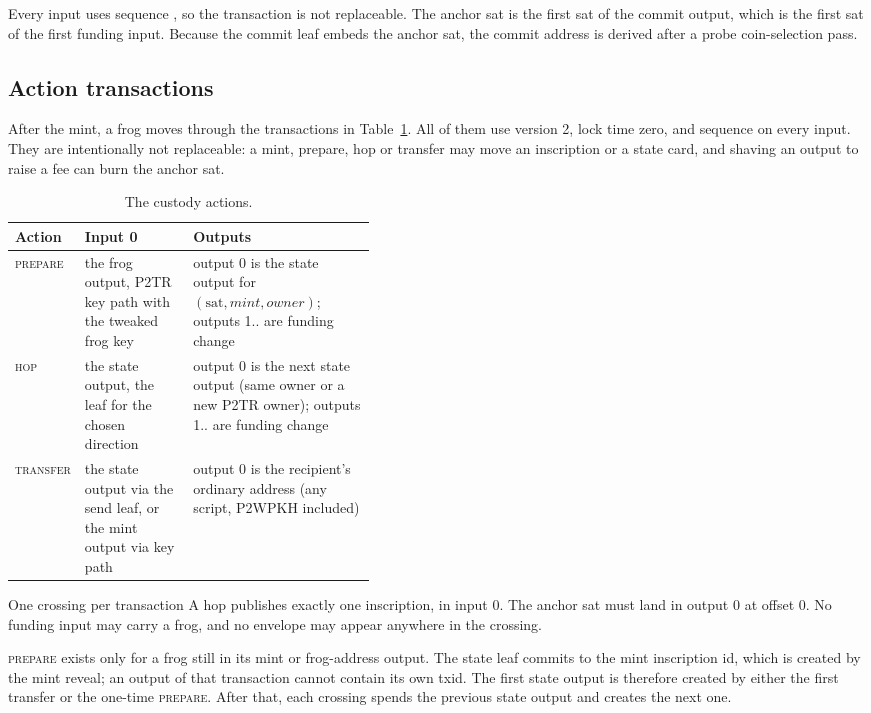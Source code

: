 Every input uses sequence , so the transaction is not
replaceable. The anchor sat is the first sat of the commit output, which is
the first sat of the first funding input. Because the commit leaf embeds the
anchor sat, the commit address is derived after a probe coin-selection pass.

\subsection{Action transactions}

After the mint, a frog moves through the transactions in
Table~\ref{tab:actions}. All of them use version 2, lock time zero, and
sequence  on every input. They are intentionally not
replaceable: a mint, prepare, hop or transfer may move an inscription or a
state card, and shaving an output to raise a fee can burn the anchor sat.

\begin{table}[htbp]
\centering
\small
\caption{The custody actions.}
\label{tab:actions}
\begin{tabularx}{\linewidth}{@{}p{0.12\linewidth}p{0.30\linewidth}X@{}}
\toprule
\textbf{Action} & \textbf{Input 0} & \textbf{Outputs} \\
\midrule
\textsc{prepare} & the frog output, P2TR key path with the tweaked frog key &
output 0 is the state output for $(\mathrm{sat},\mathit{mint},\mathit{owner})$;
outputs 1.. are funding change \\
\textsc{hop} & the state output, the leaf for the chosen direction &
output 0 is the next state output (same owner or a new P2TR owner);
outputs 1.. are funding change \\
\textsc{transfer} & the state output via the send leaf, or the mint output via
key path & output 0 is the recipient's ordinary address (any script, P2WPKH
included) \\
\bottomrule
\end{tabularx}
\end{table}

\begin{invariant}{One crossing per transaction}
A hop publishes exactly one inscription, in input 0. The anchor sat must
land in output 0 at offset 0. No funding input may carry a frog, and no
 envelope may appear anywhere in the crossing.
\end{invariant}

\textsc{prepare} exists only for a frog still in its mint or frog-address
output. The state leaf commits to the mint inscription id, which is created
by the mint reveal; an output of that transaction cannot contain its own
txid. The first state output is therefore created by either the first
transfer or the one-time \textsc{prepare}. After that, each crossing spends
the previous state output and creates the next one.

